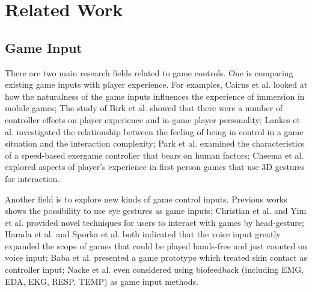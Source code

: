\documentclass{sigchi}
\begin{document}





\section{Related Work}

    \subsection{Game Input}
    There are two main research fields related to game controls. One is comparing existing game inputs with player experience. For examples, Cairns et al.\cite{Cairns:2014:ICI:2556288.2557345} looked at how the naturalness of the game inputs influences the experience of immersion in mobile games; The study of Birk et al.\cite{Birk:2013:CYG:2470654.2470752} showed that there were a number of controller effects on player experience and in-game player personality; Lankes et al.\cite{Lankes:2012:CVC:2367616.2367629} investigated the relationship between the feeling of being in control in a game situation and the interaction complexity; Park et al.\cite{Park:2014:HFS:2556288.2557091} examined the characteristics of a speed-based exergame controller that bears on human factors; Cheema et al.\cite{Cheema:2011:WWT:2159365.2159407} explored aspects of player's experience in first person games that use 3D gestures for interaction.

    Another field is to explore new kinds of game control inputs. Previous works\cite{Ekman:2008:IEU:1358628.1358820,Vickers:2013:PLT:2531922.2514856,Sundstedt:2010:GGU:1837101.1837106,Smith:2006:UEM:1178823.1178847} shows the possibility to use eye gestures as game inputs; Christian et al.\cite{Christian:2014:VSI:2559206.2580103} and Yim et al.\cite{Yim:2008:EDD:1496984.1497033} provided novel techniques for users to interact with games by head-gesture; Harada et al.\cite{Harada:2011:VGI:2042053.2042059} and Sporka et al. \cite{Sporka:2006:NIS:1168987.1169023} both indicated that the voice input greatly expanded the scope of games that could be played hands-free and just counted on voice input; Baba et al.\cite{Baba:2007:VGU:1278280.1278285} presented a game prototype which treated skin contact as controller input; Nacke et al.\cite{Nacke:2011:BGD:1978942.1978958} even considered using biofeedback (including EMG, EDA, EKG, RESP, TEMP) as game input methods.
\end{document}
